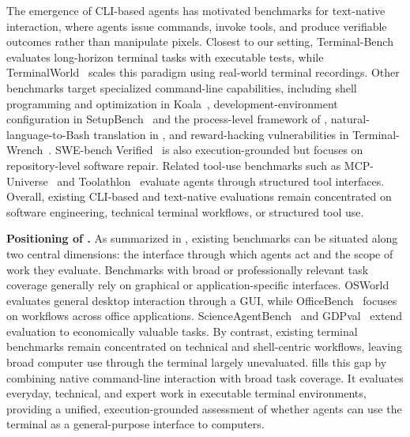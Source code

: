 The emergence of CLI-based agents has motivated benchmarks for text-native interaction, where agents issue commands, invoke tools, and produce verifiable outcomes rather than manipulate pixels. Closest to our setting, Terminal-Bench~\citep{merrill2026terminalbench} evaluates long-horizon terminal tasks with executable tests, while TerminalWorld~\citep{chu2026terminalworld} scales this paradigm using real-world terminal recordings. Other benchmarks target specialized command-line capabilities, including shell programming and optimization in Koala~\citep{lamprou2025koala}, development-environment configuration in SetupBench~\citep{arora2025setupbench} and the process-level framework of \citet{kuang2025process}, natural-language-to-Bash translation in \citet{westenfelder2025llm}, and reward-hacking vulnerabilities in Terminal-Wrench~\citep{bercovich2026terminal}. SWE-bench Verified~\citep{jimenez2023swe} is also execution-grounded but focuses on repository-level software repair. Related tool-use benchmarks such as MCP-Universe~\citep{luo2025mcp} and Toolathlon~\citep{li2026the} evaluate agents through structured tool interfaces. Overall, existing CLI-based and text-native evaluations remain concentrated on software engineering, technical terminal workflows, or structured tool use.


\noindent\textbf{Positioning of \benchname.}
As summarized in , existing benchmarks can be situated along two central dimensions: the interface through which agents act and the scope of work they evaluate. Benchmarks with broad or professionally relevant task coverage generally rely on graphical or application-specific interfaces. OSWorld~\citep{xie2024osworld} evaluates general desktop interaction through a GUI, while OfficeBench~\citep{wang2024officebench} focuses on workflows across office applications. ScienceAgentBench~\citep{chen2025scienceagentbench} and GDPval~\citep{patwardhan2025gdpval} extend evaluation to economically valuable tasks. By contrast, existing terminal benchmarks remain concentrated on technical and shell-centric workflows, leaving broad computer use through the terminal largely unevaluated. \benchname fills this gap by combining native command-line interaction with broad task coverage. It evaluates everyday, technical, and expert work in executable terminal environments, providing a unified, execution-grounded assessment of whether agents can use the terminal as a general-purpose interface to computers.


